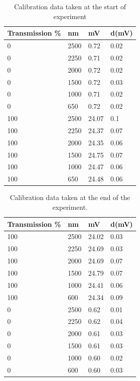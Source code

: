 \documentclass{article}
\begin{document}
\begin{table}[]
\centering
\caption{Calibration data taken at the start of experiment}
\label{cal1}
\begin{tabular}{@{}llll@{}}
\toprule
Transmission \% & nm   & mV     & d(mV) \\ \midrule
0          & 2500 & 0.72   & 0.02  \\
0          & 2250 & 0.71   & 0.02  \\
0          & 2000 & 0.72   & 0.02  \\
0          & 1500 & 0.72   & 0.03  \\
0          & 1000 & 0.71   & 0.02  \\
0          & 650  & 0.72   & 0.02  \\
100        & 2500 & 24.07  & 0.1   \\
100        & 2250 & 24.37 & 0.07 \\
100        & 2000 & 24.35  & 0.06  \\
100        & 1500 & 24.75 & 0.07 \\
100        & 1000 & 24.47  & 0.06  \\
100        & 650  & 24.48 & 0.06 \\ \bottomrule
\end{tabular}
\end{table}

\begin{table}[]
\centering
\caption{Calibration data taken at the end of the experiment.}
\label{cal2}
\begin{tabular}{@{}llll@{}}
\toprule
Transmission \%  & nm   & mV     & d(mV) \\ \midrule
100 & 2500 & 24.02  & 0.03  \\
100 & 2250 & 24.69  & 0.03  \\
100 & 2000 & 24.69 & 0.07 \\
100 & 1500 & 24.79 & 0.07 \\
100 & 1000 & 24.41 & 0.06 \\
100 & 600  & 24.34 & 0.09 \\
0   & 2500 & 0.62   & 0.01  \\
0   & 2250 & 0.62  & 0.04 \\
0   & 2000 & 0.61  & 0.03 \\
0   & 1500 & 0.61  & 0.03 \\
0   & 1000 & 0.60  & 0.02 \\
0   & 600  & 0.60  & 0.03 \\ \bottomrule
\end{tabular}
\end{table}
\end{document}
